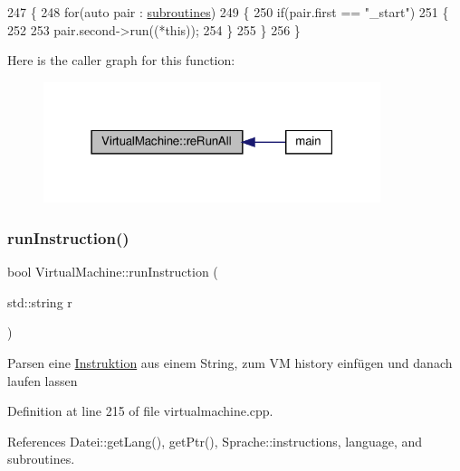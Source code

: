 \begin{DoxyCode}
247 \{
248     \textcolor{keywordflow}{for}(\textcolor{keyword}{auto} pair : \mbox{\hyperlink{class_virtual_machine_a91f5b9cfc45eaea5ce95b659705b2803}{subroutines}})
249         \{
250             \textcolor{keywordflow}{if}(pair.first == \textcolor{stringliteral}{"\_start"})
251             \{
252                 
253                 pair.second->run((*\textcolor{keyword}{this}));
254             \}
255         \}
256 \}
\end{DoxyCode}
Here is the caller graph for this function\+:
\nopagebreak
\begin{figure}[H]
\begin{center}
\leavevmode
\includegraphics[width=279pt]{class_virtual_machine_a572584de47b0e95303e71832b684175f_icgraph}
\end{center}
\end{figure}
\mbox{\label{class_virtual_machine_aabeb8078a57ca3bb98c24bc655296e9f}} 
\subsubsection{\texorpdfstring{run\+Instruction()}{runInstruction()}}
{\footnotesize\ttfamily bool Virtual\+Machine\+::run\+Instruction (\begin{DoxyParamCaption}\item[{std\+::string}]{r }\end{DoxyParamCaption})}

Parsen eine \mbox{\hyperlink{class_instruktion}{Instruktion}} aus einem String, zum VM history einfügen und danach laufen lassen 

Definition at line 215 of file virtualmachine.\+cpp.



References Datei\+::get\+Lang(), get\+Ptr(), Sprache\+::instructions, language, and subroutines.



